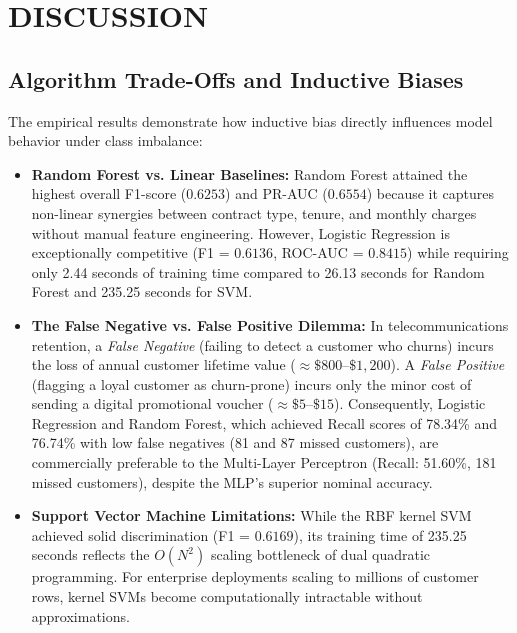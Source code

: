 \documentclass[12pt,a4paper]{report}
\begin{document}
\section{DISCUSSION}

\subsection{Algorithm Trade-Offs and Inductive Biases}
The empirical results demonstrate how inductive bias directly influences model behavior under class imbalance:
\begin{itemize}
    \item \textbf{Random Forest vs. Linear Baselines:} Random Forest attained the highest overall F1-score ($0.6253$) and PR-AUC ($0.6554$) because it captures non-linear synergies between contract type, tenure, and monthly charges without manual feature engineering. However, Logistic Regression is exceptionally competitive (F1 = $0.6136$, ROC-AUC = $0.8415$) while requiring only 2.44 seconds of training time compared to 26.13 seconds for Random Forest and 235.25 seconds for SVM.
    \item \textbf{The False Negative vs. False Positive Dilemma:} In telecommunications retention, a \textit{False Negative} (failing to detect a customer who churns) incurs the loss of annual customer lifetime value ($\approx \$800$--$\$1,200$). A \textit{False Positive} (flagging a loyal customer as churn-prone) incurs only the minor cost of sending a digital promotional voucher ($\approx \$5$--$\$15$). Consequently, Logistic Regression and Random Forest, which achieved Recall scores of 78.34\% and 76.74\% with low false negatives (81 and 87 missed customers), are commercially preferable to the Multi-Layer Perceptron (Recall: 51.60\%, 181 missed customers), despite the MLP's superior nominal accuracy.
    \item \textbf{Support Vector Machine Limitations:} While the RBF kernel SVM achieved solid discrimination (F1 = $0.6169$), its training time of 235.25 seconds reflects the $O(N^2)$ scaling bottleneck of dual quadratic programming. For enterprise deployments scaling to millions of customer rows, kernel SVMs become computationally intractable without approximations.
\end{itemize}
\end{document}
